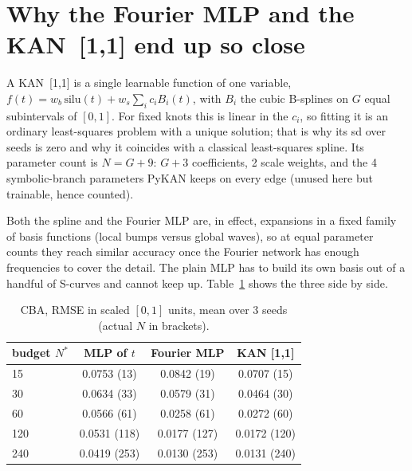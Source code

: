 \documentclass[11pt,a4paper]{article}
\begin{document}
\section{Why the Fourier MLP and the KAN~[1,1] end up so close}
A KAN~[1,1] is a single learnable function of one variable,
$f(t)=w_b\,\mathrm{silu}(t)+w_s\sum_{i}c_i B_i(t)$, with $B_i$ the cubic B-splines on $G$ equal subintervals of $[0,1]$. For fixed knots this is linear in the $c_i$, so fitting it is an ordinary least-squares problem with a unique solution; that is why its sd over seeds is zero and why it coincides with a classical least-squares spline. Its parameter count is $N=G+9$: $G+3$ coefficients, 2 scale weights, and the 4 symbolic-branch parameters PyKAN keeps on every edge (unused here but trainable, hence counted).

Both the spline and the Fourier MLP are, in effect, expansions in a fixed family of basis functions (local bumps versus global waves), so at equal parameter counts they reach similar accuracy once the Fourier network has enough frequencies to cover the detail. The plain MLP has to build its own basis out of a handful of S-curves and cannot keep up. Table~\ref{tab:cba} shows the three side by side.

\begin{table}[H]\centering
\caption{CBA, RMSE in scaled $[0,1]$ units, mean over 3 seeds (actual $N$ in brackets).}
\label{tab:cba}
\begin{tabular}{lccc}
\toprule
budget $N^*$ & MLP of $t$ & Fourier MLP & KAN [1,1]\\
\midrule
15  & 0.0753 (13) & 0.0842 (19) & 0.0707 (15)\\
30  & 0.0634 (33) & 0.0579 (31) & 0.0464 (30)\\
60  & 0.0566 (61) & 0.0258 (61) & 0.0272 (60)\\
120 & 0.0531 (118) & 0.0177 (127) & 0.0172 (120)\\
240 & 0.0419 (253) & 0.0130 (253) & 0.0131 (240)\\
\bottomrule
\end{tabular}
\end{table}
\end{document}
